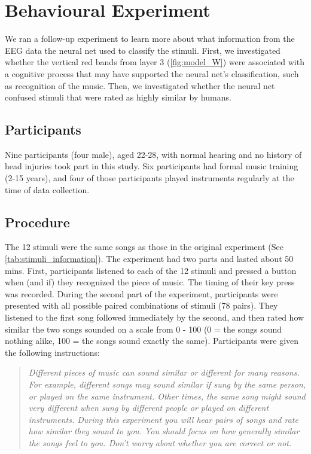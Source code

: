 \chapter{Behavioural Experiment}
We ran a follow-up experiment to learn more about what information from the EEG data the neural net used to classify the stimuli. 
First, we investigated whether the vertical red bands from layer 3 (\autoref{fig:model_W}) were associated with a cognitive process that may have supported the neural net's classification, such as recognition of the music. 
Then, we investigated whether the neural net confused stimuli that were rated as highly similar by humans.
\section{Participants}
Nine participants (four male), aged 22-28, with normal hearing and no history of head injuries took part in this study. 
Six participants had formal music training (2-15 years), and four of those participants played instruments regularly at the time of data collection. 
\section{Procedure}
The 12 stimuli were the same songs as those in the original experiment (See \autoref{tab:stimuli_information}).
The experiment had two parts and lasted about 50 mins.
First, participants listened to each of the 12 stimuli and pressed a button when (and if) they recognized the piece of music.
The timing of their key press was recorded. 
During the second part of the experiment, participants were presented with all possible paired combinations of stimuli (78 pairs). 
They listened to the first song followed immediately by the second, and then rated how similar the two songs sounded on a scale from 0 - 100 (0 = the songs sound nothing alike, 100 = the songs sound exactly the same).
Participants were given the following instructions:
\begin{quote}\textit{
Different pieces of music can sound similar or different for many reasons.
For example, different songs may sound similar if sung by the same person, or played on the same instrument.
Other times, the same song might sound very different when sung by different people or played on different instruments.
During this experiment you will hear pairs of songs and rate how similar they sound to you.
You should focus on how generally similar the songs feel to you. Don't worry about whether you are correct or not.}
\end{quote}

